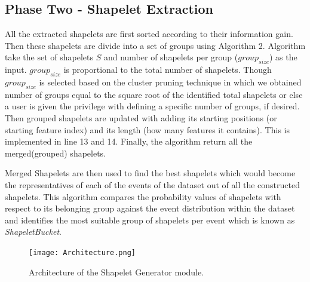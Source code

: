 \documentclass[conference]{IEEEtran}  %
\begin{document}
\subsection{Phase Two - Shapelet Extraction}
All the extracted shapelets are first sorted according to their information gain. Then these shapelets are divide into a set of groups using Algorithm 2. Algorithm take the set of shapelets $S$ and number of shapelets per group ($group_{size}$) as the input. $group_{size}$ is proportional to the total number of shapelets. Though $group_{size}$ is selected based on the cluster pruning technique in which we obtained number of groups equal to the square root of the identified total shapelets or else a user is given the privilege with defining a specific number of groups, if desired. Then grouped shapelets are updated with adding its starting positions (or starting feature index) and its length (how many features it contains). This is implemented in line 13 and 14. Finally, the algorithm return all the merged(grouped) shapelets.

Merged Shapelets are then used to find the best shapelets which would become the representatives of each of the events of the dataset out of all the constructed shapelets. This algorithm compares the probability values of shapelets with respect to its belonging group against the event distribution within the dataset and identifies the most suitable group of shapelets per event which is known as \textit{ShapeletBucket}.

\begin{figure}
\texttt{[image: Architecture.png]}
\caption{Architecture of the Shapelet Generator module.}
\label{fig:hintgen}
\end{figure}
\end{document}
